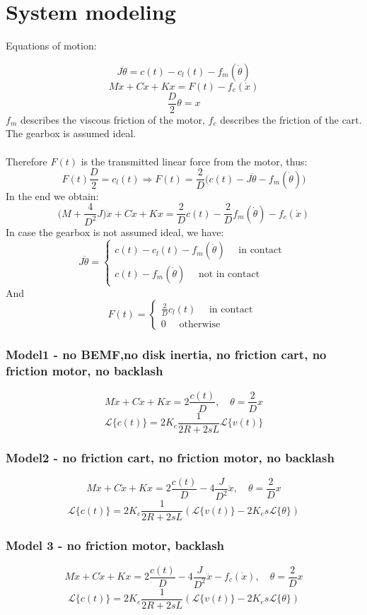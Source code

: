 
\part{System modeling}
Equations of motion:

$$J\ddot{\theta}=c(t)-c_l(t) - f_m(\dot{\theta})$$
$$M\ddot{x}+C\dot{x}+Kx = F(t) - f_c(\dot{x})$$
$$\frac{D}{2}\theta = x$$
$f_m$ describes the viscous friction of the motor, $f_c$ describes the friction of the cart. The gearbox is assumed ideal. \\ \\
Therefore $F(t)$ is the transmitted linear force from the motor, thus:
$$F(t)\frac{D}{2} = c_l(t) \Rightarrow F(t) = \frac{2}{D} \Big(c(t)-J\ddot{\theta}-f_m(\dot{\theta})\Big)$$
In the end we obtain:
$$\Big(M+\frac{4}{D^2} J\Big) \ddot{x}+C\dot{x}+Kx = \frac{2}{D}c(t) -\frac{2}{D}f_m(\dot{\theta}) - f_c(\dot{x})$$
In case the gearbox is not assumed ideal, we have:
$$J\ddot{\theta}= \begin{cases}
c(t)-c_l(t) - f_m(\dot{\theta}) \quad \text{ in contact } \\
c(t)-f_m(\dot{\theta}) \quad \text{ not in contact }
\end{cases}
$$
And
$$F(t) = \begin{cases}
\frac{2}{D}c_l(t)\quad \text{ in contact } \\
0 \quad \text{ otherwise }
\end{cases}
$$

\section{Model1 - no BEMF,no disk inertia, no friction cart, no friction motor, no backlash}
$$M\ddot{x} + C\dot{x}+Kx = 2\frac{c(t)}{D}, \quad \theta = \frac{2}{D}x$$
$$\mathcal{L}\{c(t)\} = 2K_e \frac{1}{2R+2sL} \mathcal{L}\{ v(t)\}$$

\section{Model2 - no friction cart, no friction motor, no backlash}
$$M\ddot{x} + C\dot{x}+Kx = 2\frac{c(t)}{D}  - 4\frac{J}{D^2}\ddot{x}, \quad \theta = \frac{2}{D}x$$
$$\mathcal{L}\{c(t)\} = 2K_e \frac{1}{2R+2sL} (\mathcal{L}\{ v(t)\}-2K_e s \mathcal{L}\{\theta \})$$


\section{Model 3 - no friction motor, backlash}
$$M\ddot{x} + C\dot{x}+Kx = 2\frac{c(t)}{D} - 4\frac{J}{D^2}\ddot{x} - f_c(\dot{x}), \quad \theta = \frac{2}{D}x$$
$$\mathcal{L}\{c(t)\} = 2K_e \frac{1}{2R+2sL} (\mathcal{L}\{ v(t)\}-2K_e s \mathcal{L}\{\theta \})$$



